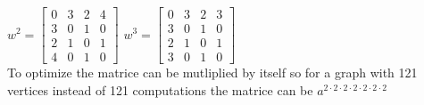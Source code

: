 \documentclass[12pt, a4paper]{article}
\begin{document}
					$w^2=\begin{bmatrix}0&3&2&4\\3&0&1&0\\2&1&0&1\\4&0&1&0\end{bmatrix}$
					$w^3=\begin{bmatrix}0&3&2&3\\3&0&1&0\\2&1&0&1\\3&0&1&0\end{bmatrix}$\\
					To optimize the matrice can be mutliplied by itself so for a graph with 121 vertices instead of 121 computations the matrice can be $a^{2\cdot 2\cdot 2\cdot 2\cdot 2\cdot 2\cdot 2}$
					


			
			

			
				
					
\end{document}
